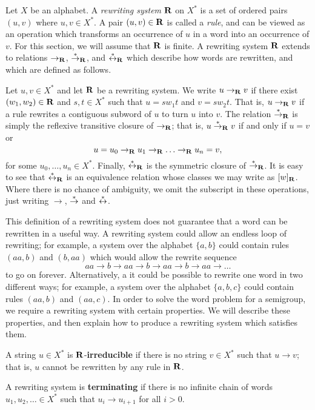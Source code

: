 Let $X$ be an alphabet.  A \textit{rewriting system} $\mathbf{R}$ on $X^*$ is a
set of ordered pairs $(u,v)$ where $u, v \in X^*$.
A pair $(u,v) \in \mathbf{R}$ is called a \textit{rule}, and can be viewed as
an operation which transforms an occurrence of $u$ in a word into an occurrence
of $v$.
For this section, we will assume that $\mathbf{R}$ is finite.
A rewriting system $\mathbf{R}$ extends to relations
$\to_{\mathbf{R}}$, $\stackrel{*}{\to}_{\mathbf{R}}$, and $\stackrel{*}{\leftrightarrow}_{\mathbf{R}}$
which describe how words are rewritten, and which are defined as follows.

Let $u, v \in X^*$ and let $\mathbf{R}$ be a rewriting system.
We write $u \to_{\mathbf{R}} v$ if there exist $(w_1, w_2) \in \mathbf{R}$ and
$s, t \in X^*$ such that $u=sw_1t$ and $v=sw_2t$.
That is, $u \to_{\mathbf{R}} v$ if a rule rewrites a contiguous subword of $u$ to turn
$u$ into $v$.  The relation $\stackrel{*}{\to}_{\mathbf{R}}$ is simply the reflexive transitive
closure of $\to_{\mathbf{R}}$; that is, $u \stackrel{*}{\to}_{\mathbf{R}} v$ if and only if $u = v$ or
$$u = u_0 \to_{\mathbf{R}} u_1 \to_{\mathbf{R}} \ldots \to_{\mathbf{R}} u_n = v,$$
for some $u_0, \ldots, u_n \in X^*$.
Finally, $\stackrel{*}{\leftrightarrow}_{\mathbf{R}}$ is the symmetric closure of
$\stackrel{*}{\to}_{\mathbf{R}}$.  It is easy to see that $\stackrel{*}{\leftrightarrow}_{\mathbf{R}}$ is an equivalence
relation whose classes we may write as $[w]_{\mathbf{R}}$.
Where there is no chance of ambiguity, we omit the subscript in these
operations, just writing $\to$, $\stackrel{*}{\to}$ and $\stackrel{*}{\leftrightarrow}$.

This definition of a rewriting system does not guarantee that a word can be
rewritten in a useful way.  A rewriting system could allow an endless loop of
rewriting; for example, a system over the alphabet $\{a,b\}$ could contain rules
$(aa,b)$ and $(b,aa)$ which would allow the rewrite sequence
$$aa \to b \to aa \to b \to aa \to b \to aa \to \ldots$$
to go on forever.  Alternatively, a it could be possible to rewrite one word in
two different ways; for example, a system over the alphabet $\{a,b,c\}$ could
contain rules $(aa,b)$ and $(aa,c)$.
In order to solve the word problem for a semigroup, we require a
rewriting system with certain properties.  We will describe these properties,
and then explain how to produce a rewriting system which satisfies them.

\begin{definition}
  A string $u \in X^*$ is $\mathbf{R}$-\textbf{irreducible} if there is no
  string $v \in X^*$ such that $u \to v$; that is, $u$ cannot be rewritten by
  any rule in $\mathbf{R}$.  \cite[Def~12.13]{cgt}
\end{definition}

\begin{definition}
  A rewriting system is \textbf{terminating} if there is no infinite chain of
  words $u_1, u_2, \ldots \in X^*$ such that $u_i \to u_{i+1}$ for all $i > 0$.
\end{definition}

